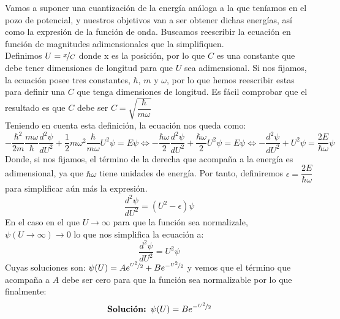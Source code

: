 \documentclass{report}
\begin{document}
    \noindent Vamos a suponer una cuantización de la energía análoga a la
    que teníamos en el pozo de potencial, y nuestros objetivos van a ser
    obtener dichas energías, así como la expresión de la función de onda.
    Buscamos reescribir la ecuación en función de magnitudes adimensionales
    que la simplifiquen.\\

    \noindent Definimos $U=\nicefrac{x}{C}$ donde x es la posición, por lo que
    $C$ es una constante que debe tener dimensiones de longitud para que
    $U$ sea adimensional. Si nos fijamos, la ecuación posee tres constantes,
    $\hbar$, $m$ y $\omega$, por lo que hemos reescribir estas para definir
    una $C$ que tenga dimensiones de longitud. Es fácil comprobar que el 
    resultado es que $C$ debe ser $\boxed{C=\sqrt{\dfrac{\hbar}{m\omega}}}$\\

    \noindent Teniendo en cuenta esta definición, la ecuación nos queda como:
    \[-\dfrac{\hbar^2}{2m}\dfrac{m\omega}{\hbar}\dfrac{d^2\psi}{dU^2}+\dfrac12
    m\omega^2\dfrac{\hbar}{m\omega}U^2\psi=E\psi\Longleftrightarrow
    -\dfrac{\hbar\omega}{2}\dfrac{d^2\psi}{dU^2}+\dfrac{\hbar\omega}{2}U^2\psi=E\psi
    \Longleftrightarrow -\dfrac{d^2\psi}{dU^2}+U^2\psi=\dfrac{2E}{\hbar\omega}\psi\]
    Donde, si nos fijamos, el término de la derecha que acompaña a la energía
    es adimensional, ya que $\hbar\omega$ tiene unidades de energía. Por tanto,
    definiremos $\epsilon=\dfrac{2E}{\hbar\omega}$ para simplificar aún más la
    expresión.
    \begin{equation}
      \boxed{\dfrac{d^2\psi}{dU^2}=(U^2-\epsilon)\psi}
      \label{eq:potencialArmónicoU}
    \end{equation}
    \noindent En el caso en el que $U\longrightarrow\infty$ para que la función sea
    normalizale, $\psi(U\rightarrow\infty)\longrightarrow 0$ lo que nos simplifica
    la ecuación a:
    \[\dfrac{d^2\psi}{dU^2}=U^2\psi\]
    Cuyas soluciones son: $\psi(U)=Ae^{\nicefrac{U^2}{2}}+Be^{-\nicefrac{U^2}{2}}$ y
    vemos que el término que acompaña a $A$ debe ser cero para que la función 
    sea normalizable por lo que finalmente:
    \[\text{\textbf{Solución: }}\psi(U)=Be^{-\nicefrac{U^2}{2}}\]\\
\end{document}
